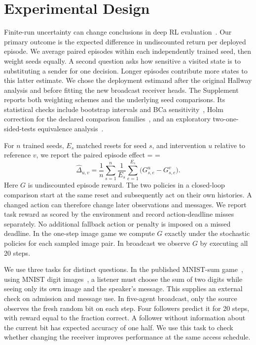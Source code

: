 \documentclass[a4paper,fleqn]{cas-dc}
\begin{document}
\section{Experimental Design}
Finite-run uncertainty can change conclusions in deep RL evaluation~\citep{agarwal2021deep}. Our primary outcome is the expected difference in undiscounted return per deployed episode. We average paired episodes within each independently trained seed, then weight seeds equally. A second question asks how sensitive a visited state is to substituting a sender for one decision. Longer episodes contribute more states to this latter estimate. We chose the deployment estimand after the original Hallway analysis and before fitting the new broadcast receiver heads. The Supplement reports both weighting schemes and the underlying seed comparisons. Its statistical checks include bootstrap intervals and BCa sensitivity~\citep{efron1987better}, Holm correction for the declared comparison families~\citep{holm1979simple}, and an exploratory two-one-sided-tests equivalence analysis~\citep{schuirmann1987comparison}.

For $n$ trained seeds, $E_s$ matched resets for seed $s$, and intervention $u$ relative to reference $v$, we report the paired episode effect
\begingroup
\makeatletter\@fleqnfalse\makeatother
\abovedisplayshortskip=\abovedisplayskip
\belowdisplayshortskip=\belowdisplayskip
\begin{equation}
 \widehat{\Delta}_{u,v}=\frac{1}{n}\sum_{s=1}^{n}\frac{1}{E_s}
       \sum_{e=1}^{E_s}\bigl(G_{s,e}^{u}-G_{s,e}^{v}\bigr).
 \label{eq:episode_effect}
\end{equation}
\endgroup
Here $G$ is undiscounted episode reward. The two policies in a closed-loop comparison start at the same reset and subsequently act on their own histories. A changed action can therefore change later observations and messages. We report task reward as scored by the environment and record action-deadline misses separately. No additional fallback action or penalty is imposed on a missed deadline. In the one-step image game we compute $G$ exactly under the stochastic policies for each sampled image pair. In broadcast we observe $G$ by executing all 20 steps.

We use three tasks for distinct questions. In the published MNIST-sum game~\citep{eccles2019biases}, using MNIST digit images~\citep{lecun1998gradient}, a listener must choose the sum of two digits while seeing only its own image and the speaker's message. This supplies an external check on admission and message use. In five-agent broadcast, only the source observes the fresh random bit on each step. Four followers predict it for 20 steps, with reward equal to the fraction correct. A follower without information about the current bit has expected accuracy of one half. We use this task to check whether changing the receiver improves performance at the same access schedule.
\end{document}
